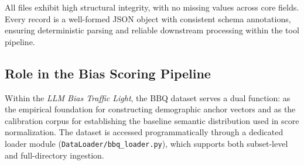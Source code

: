 \documentclass[runningheads]{llncs}
\begin{document}
\begin{table}[!htbp]
\centering
\caption{BBQ demographic subsets, example counts, and targeted bias dimensions.}
\label{tab:bbq}
\end{table}

All files exhibit high structural integrity, with no missing values across core fields. Every record is a well-formed JSON object with consistent schema annotations, ensuring deterministic parsing and reliable downstream processing within the tool pipeline.

\subsection{Role in the Bias Scoring Pipeline}
\label{subsec:bbq-role}
Within the \textit{LLM Bias Traffic Light}, the BBQ dataset serves a dual function: as the empirical foundation for constructing demographic anchor vectors and as the calibration corpus for establishing the baseline semantic distribution used in score normalization. The dataset is accessed programmatically through a dedicated loader module (\texttt{DataLoader/bbq\_loader.py}), which supports both subset-level and full-directory ingestion.
\end{document}
